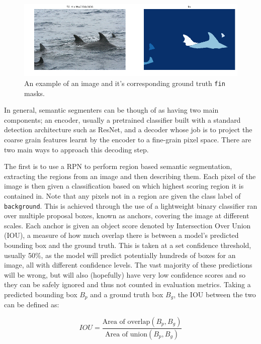 \begin{figure}
	\begin{center}
		\includegraphics[scale=0.5]{Chapter2/figs/masks-example.png}
	\end{center}
	\caption{An example of an image and it's corresponding ground truth \texttt{fin} masks.}
	\label{fig:masks-example}
\end{figure}

In general, semantic segmenters can be though of as having two main components; an encoder, usually a pretrained classifier built with a standard detection architecture such as ResNet, and a decoder whose job is to project the coarse grain features learnt by the encoder to a fine-grain pixel space. There are two main ways to approach this decoding step.

The first is to use a RPN to perform region based semantic segmentation, extracting the regions from an image and then describing them. Each pixel of the image is then given a classification based on which highest scoring region it is contained in. Note that any pixels not in a region are given the class label of \texttt{background}. This is achieved through the use of a lightweight binary classifier ran over multiple proposal boxes, known as anchors, covering the image at different scales. Each anchor is given an object score denoted by Intersection Over Union (IOU), a measure of how much overlap there is between a model's predicted bounding box and the ground truth. This is taken at a set confidence threshold, usually 50\%, as the model will predict potentially hundreds of boxes for an image, all with different confidence levels. The vast majority of these predictions will be wrong, but will also (hopefully) have very low confidence scores and so they can be safely ignored and thus not counted in evaluation metrics. Taking a predicted bounding box $B_p$ and a ground truth box $B_g$, the IOU between the two can be defined as:

\begin{equation}
IOU = \frac{\text{Area of overlap}(B_p, B_g)}{\text{Area of union}(B_p, B_g)}
\end{equation}

